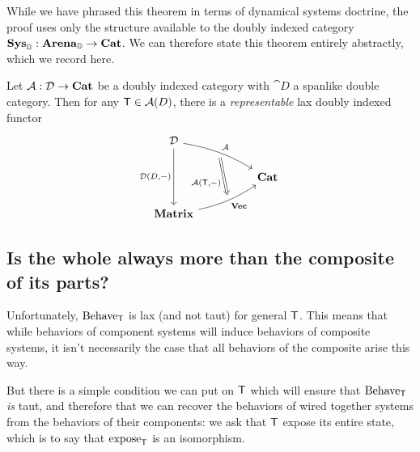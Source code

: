 \documentclass[DynamicalBook]{subfiles}
\begin{document}
While we have phrased this theorem in terms of dynamical systems doctrine, the
proof uses only the structure available to the doubly indexed category
$\textbf{Sys}_{\mathbb{D}} : \textbf{Arena}_{\mathbb{D}} \to \textbf{Cat}$. We can therefore state this
theorem entirely abstractly, which we record here.
\begin{theorem}
  Let $\mathcal{A} : \mathcal{D} \to \textbf{Cat}$ be a doubly indexed category with
  $\cat{D}$ a spanlike double category. Then for any $\mathsf{T} \in \mathcal{A}(D)$,
  there is a \emph{representable} lax doubly indexed functor
\[\begin{tikzcd}
	{\cat{D}} \\
	&& {\Cat{Cat}} \\
	{\Cat{Matrix}}
	\arrow[""{name=0, anchor=center, inner sep=0}, "{\cat{A}}", from=1-1,
  to=2-3, bend left = 10]
	\arrow[""{name=1, anchor=center, inner sep=0}, "{\Cat{Vec}}"', from=3-1,
  to=2-3, bend right = 10]
	\arrow["{\cat{D}\left(D,-\right)}"', from=1-1, to=3-1]
	\arrow["{\cat{A}(\Sys{T}, -)}"', shorten <=4pt, shorten >=4pt, Rightarrow,
  from=0, to=1]
\end{tikzcd}\]
\end{theorem}

\subsection{Is the whole always more than the composite of its parts?}
Unfortunately, $\mathrm{Behave}_{\mathsf{T}}$ is lax (and not taut) for general
$\mathsf{T}$. This means that while behaviors of component systems will induce
behaviors of composite systems, it isn't necessarily the case that all behaviors
of the composite arise this way.

But there is a simple condition we can put on $\mathsf{T}$ which will
ensure that $\mathrm{Behave}_{\mathsf{T}}$ \emph{is} taut, and therefore that we can
recover the behaviors of wired together systems from the behaviors of their
components: we ask that $\mathsf{T}$ expose its entire state, which is to say that
$\mathrm{expose}_{\mathsf{T}}$ is an isomorphism.
\end{document}
